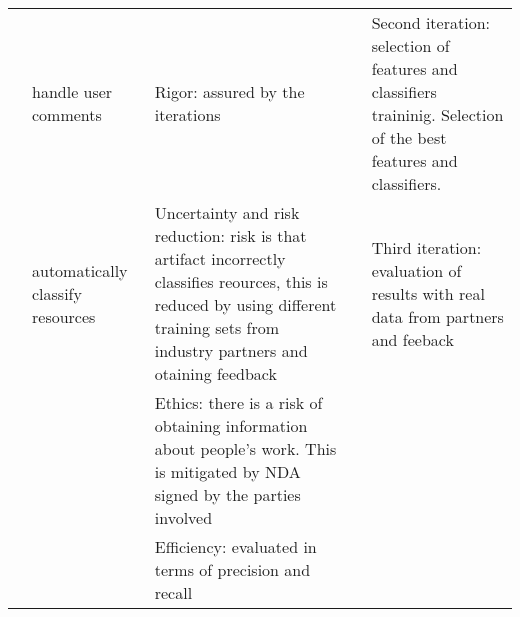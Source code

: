 \begin{longtable}[c]{@{}p{1.2cm}p{2.5cm}p{5cm}p{3cm}p{4cm}@{}}
                  & handle user comments                           & Rigor: assured by the iterations                                                                                                                                                                                                                                         &                                                                                                                                                      & Second iteration: selection of features and classifiers traininig. Selection of the best features and classifiers.            \\
                  & automatically classify resources               & Uncertainty and risk reduction: risk is that artifact incorrectly classifies reources, this is reduced by using different training sets from industry partners and otaining feedback                                                                                     &                                                                                                                                                      & Third iteration: evaluation of results with real data from partners and feeback                                               \\
                  &                                                & Ethics: there is a risk of obtaining information about people’s work. This is mitigated by NDA signed by the parties involved                                                                                                                                            &                                                                                                                                                      &                                                                                                                               \\
                  &                                                & Efficiency: evaluated in terms of precision and recall                                                                                                                                                                                                                   &                                                                                                                                                      &                                                                                                                               \\* \midrule

\end{longtable}
